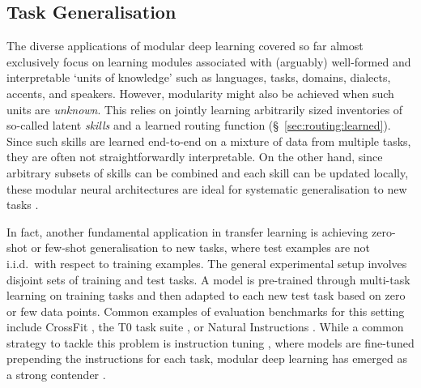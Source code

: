\subsection{Task Generalisation}
\label{ssec:task_gen}
The diverse applications of modular deep learning covered so far almost exclusively focus on learning modules associated with (arguably) well-formed and interpretable `units of knowledge' such as languages, tasks, domains, dialects, accents, and speakers. However, modularity might also be achieved when such units are \textit{unknown}. This relies on jointly learning arbitrarily sized inventories of so-called latent \textit{skills} and a learned routing function (\S~\ref{sec:routing:learned}). Since such skills are learned end-to-end on a mixture of data from multiple tasks, they are often not straightforwardly interpretable. On the other hand, since arbitrary subsets of skills can be combined and each skill can be updated locally, these modular neural architectures are ideal for systematic generalisation to new tasks \citep{Zhang2022SkillNet,ponti2022combining}. 

In fact, another fundamental application in transfer learning is achieving zero-shot or few-shot generalisation to new tasks, where test examples are not i.i.d.\ with respect to training examples. The general experimental setup involves disjoint sets of training and test tasks. A model is pre-trained through multi-task learning on training tasks and then adapted to each new test task based on zero or few data points. Common examples of evaluation benchmarks for this setting include CrossFit \citep{ye-etal-2021-crossfit}, the T0 task suite \citep{sanh2022multitask}, or Natural Instructions \citep{mishra-etal-2022-cross}. While a common strategy to tackle this problem is instruction tuning \citep{sanh2022multitask,wei2022finetuned}, where models are fine-tuned prepending the instructions for each task, modular deep learning has emerged as a strong contender \citep{alet2018modular,kudugunta2021beyond,ponti2022combining}.

